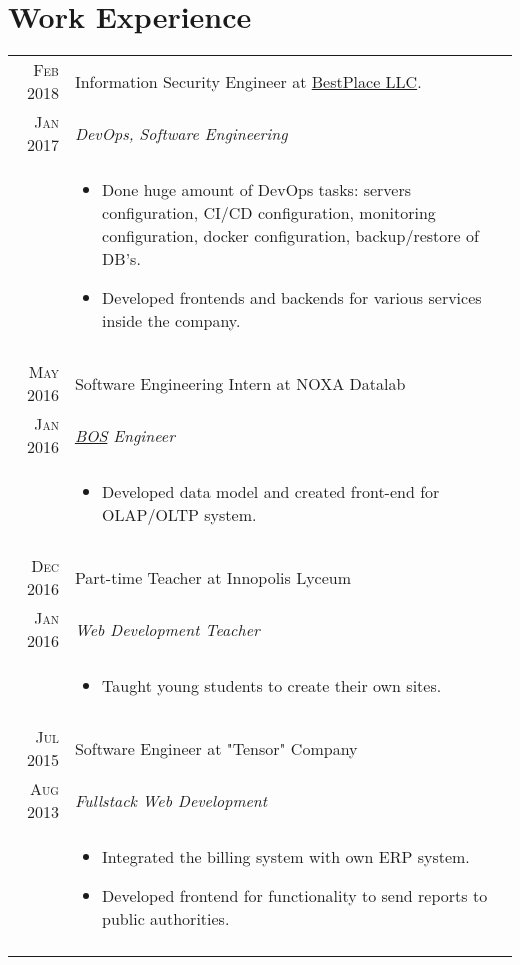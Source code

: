 \documentclass[a4paper,10pt]{article}
\begin{document}
\section{Work Experience}
\begin{tabular}{r|p{11cm}}
 \textsc{Feb 2018} & Information Security Engineer at \href{https://bestplace.ai}{BestPlace LLC}. \\\textsc{Jan 2017}&\emph{DevOps, Software Engineering}\\&\footnotesize{
 \begin{itemize}
 \item Done huge amount of DevOps tasks: servers configuration, CI/CD configuration, monitoring configuration, docker configuration, backup/restore of DB's.
 \item Developed frontends and backends for various services inside the company.
 \end{itemize}
 }\\\multicolumn{2}{c}{} \\
 \textsc{May 2016} & Software Engineering Intern at NOXA Datalab \\\textsc{Jan 2016}&\emph{\href{https://www.intel.com/content/dam/www/public/us/en/documents/solution-briefs/nomura-bos-solution-brief.pdf}{BOS} Engineer}\\&\footnotesize{
 \begin{itemize}
 \item Developed data model and created front-end for OLAP/OLTP system.
 \end{itemize}
 }\\\multicolumn{2}{c}{}\\
 \textsc{Dec 2016} & Part-time Teacher at Innopolis Lyceum \\\textsc{Jan 2016}&\emph{Web Development Teacher}\\&\footnotesize{
 \begin{itemize}
 \item Taught young students to create their own sites.
 \end{itemize}
 }\\\multicolumn{2}{c}{}\\
 \textsc{Jul 2015} & Software Engineer at "Tensor" Company \\\textsc{Aug 2013}&\emph{Fullstack Web Development}\\&
 \footnotesize{
 \begin{itemize}
 \item Integrated the billing system with own ERP system.
 \item Developed frontend for functionality to send reports to public authorities.
 \end{itemize}
 }\\
 \multicolumn{2}{c}{} \\
\end{tabular}
\end{document}
